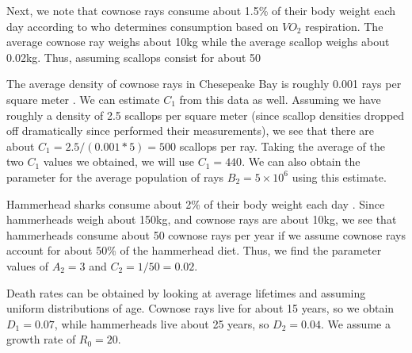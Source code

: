 \documentclass[%
        final,
        notitlepage,
        narroweqnarray,
        inline,
        ]{ieee}
\begin{document}
Next, we note that cownose rays consume about 1.5\% of their body weight each day according to \cite{Neer(2005)} who determines consumption based on $VO_2$ respiration. The average cownose ray weighs about 10kg while the average scallop weighs about 0.02kg. Thus, assuming scallops consist for about 50%

The average density of cownose rays in Chesepeake Bay is roughly 0.001 rays per square meter \cite{Blaylock(1993)}. We can estimate $C_1$ from this data as well. Assuming we have roughly a density of 2.5 scallops per square meter (since scallop densities dropped off dramatically since \cite{Fay(1983)} performed their measurements), we see that there are about $C_1 = 2.5/(0.001*5) = 500$ scallops per ray. Taking the average of the two $C_1$ values we obtained, we will use $C_1 =  440$. We can also obtain the parameter for the average population of rays $B_2 = 5 \times 10^{6}$ using this estimate.

Hammerhead sharks consume about 2\% of their body weight each day \cite{Bush(2002)}. Since hammerheads weigh about 150kg, and cownose rays are about 10kg, we see that hammerheads consume about 50 cownose rays per year if we assume cownose rays account for about 50\% of the hammerhead diet. Thus, we find the parameter values of $A_2 = 3$ and $ C_2 = 1/50 = 0.02$.  

Death rates can be obtained by looking at average lifetimes and assuming uniform distributions of age. Cownose rays live for about 15 years, so we obtain $D_1 = 0.07$, while hammerheads live about 25 years, so $D_2 = 0.04$. We assume a growth rate of $R_0 = 20$. 
\end{document}

